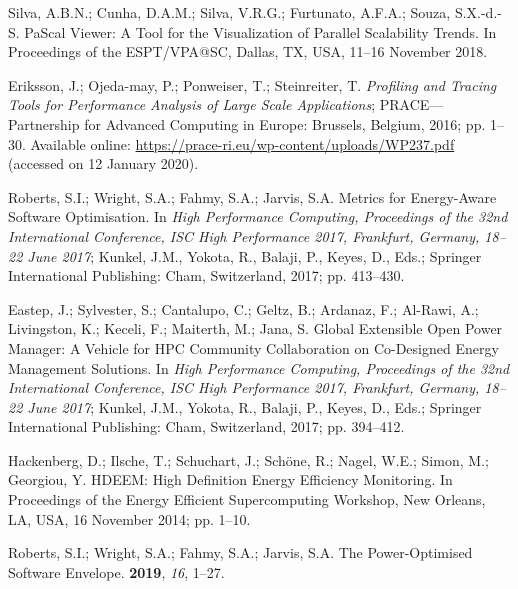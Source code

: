 \begin{thebibliography}{999}
	
	Silva, A.B.N.; Cunha, D.A.M.; Silva, V.R.G.; Furtunato, A.F.A.; Souza, S.X.-d.-S.
	\newblock PaScal Viewer: A Tool for the Visualization of Parallel Scalability
	Trends.
	\newblock In Proceedings of the ESPT/VPA@SC, Dallas, TX, USA, 11--16 November 2018.
	
	Eriksson, J.; Ojeda-may, P.; Ponweiser, T.; Steinreiter, T.
	\newblock \emph{Profiling and Tracing Tools for Performance Analysis of Large Scale Applications};
	\newblock PRACE---Partnership for Advanced Computing in Europe: Brussels, Belgium, 2016; 
	pp. 1--30.
	\newblock Available online: \url{https://prace-ri.eu/wp-content/uploads/WP237.pdf} (accessed on 12 January 2020).
	
	
	Roberts, S.I.; Wright, S.A.; Fahmy, S.A.; Jarvis, S.A.
	\newblock Metrics for Energy-Aware Software Optimisation.
	\newblock In \emph{High Performance Computing, Proceedings of the 32nd International Conference, ISC High Performance 2017, Frankfurt, Germany, 18--22 June 2017}; Kunkel, J.M., Yokota, R., Balaji, P.,
	Keyes, D., Eds.; Springer International Publishing: Cham, Switzerland, 2017; pp.
	413--430.
	
	Eastep, J.; Sylvester, S.; Cantalupo, C.; Geltz, B.; Ardanaz, F.; Al-Rawi, A.;
	Livingston, K.; Keceli, F.; Maiterth, M.; Jana, S.
	\newblock Global Extensible Open Power Manager: A Vehicle for HPC Community
	Collaboration on Co-Designed Energy Management Solutions.
	\newblock In \emph{High Performance Computing, Proceedings of the 32nd International Conference, ISC High Performance 2017, Frankfurt, Germany, 18--22 June 2017}; Kunkel, J.M., Yokota, R., Balaji, P.,
	Keyes, D., Eds.; Springer International Publishing: Cham, Switzerland, 2017; pp.
	394--412.
	
	Hackenberg, D.; Ilsche, T.; Schuchart, J.; Schöne, R.; Nagel, W.E.; Simon, M.;
	Georgiou, Y.
	\newblock HDEEM: High Definition Energy Efficiency Monitoring.
	\newblock In Proceedings of the Energy Efficient Supercomputing Workshop, New Orleans, LA, USA, 16 November 2014; pp. 1--10.
	
	
	Roberts, S.I.; Wright, S.A.; Fahmy, S.A.; Jarvis, S.A.
	\newblock The Power-Optimised Software Envelope.
	 {\bf 2019}, {\em 16}, 1--27.
	

\end{thebibliography}
